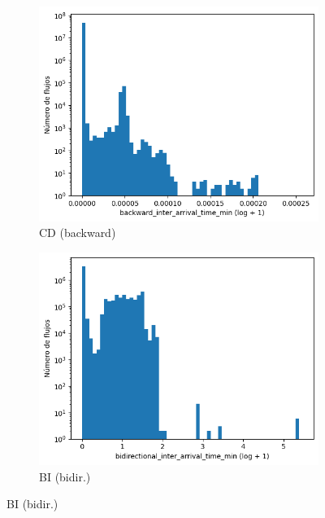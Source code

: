\begin{figure}[H]
\begin{subfigure}[b]{0.26\textwidth}
        \includegraphics[width=\textwidth]{media/packet_pincer_cicddos/backward_inter_arrival_time_min_log_x_log_y.png}
        \caption{CD (backward)}
    \end{subfigure}
    \hfill
    \begin{subfigure}[b]{0.26\textwidth}
        \centering
        \includegraphics[width=\linewidth]{media/packet_pincer_botiot/bidirectional_inter_arrival_time_min_log_x_log_y.png}
        \caption{BI (bidir.)}

\end{subfigure}
\end{figure}
